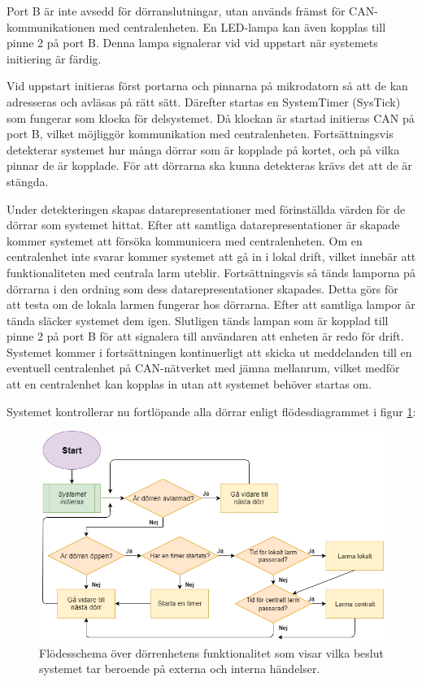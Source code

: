 \documentclass{article}
\begin{document}
Port B är inte avsedd för dörranslutningar, utan används främst för CAN-\\kommunikationen
med centralenheten. En LED-lampa kan även kopplas till \\ pinne 2 på port B. Denna lampa signalerar vid vid uppstart när systemets initiering är färdig.

Vid uppstart initieras först portarna och pinnarna på mikrodatorn så att de kan adresseras
och avläsas på rätt sätt. Därefter startas en SystemTimer (SysTick) som fungerar som klocka för delsystemet.
Då klockan är startad initieras CAN på port B, vilket möjliggör kommunikation med centralenheten. Fortsättningsvis detekterar systemet hur många dörrar som är kopplade på kortet, och på vilka pinnar de är kopplade. För att dörrarna ska kunna detekteras krävs det att de är stängda.

Under detekteringen skapas datarepresentationer med förinställda värden för de dörrar som systemet
hittat. Efter att samtliga datarepresentationer är skapade kommer systemet att försöka kommunicera med centralenheten. Om en centralenhet inte svarar kommer systemet att gå in i lokal drift, vilket innebär att funktionaliteten med centrala larm uteblir.
Fortsättningsvis så tänds lamporna på dörrarna i den ordning som dess datarepresentationer skapades. Detta görs för att testa om de lokala larmen fungerar hos dörrarna. Efter att samtliga lampor är tända släcker systemet dem igen.
Slutligen tänds lampan som är kopplad till pinne 2 på port B för att signalera till användaren att enheten är redo för drift. Systemet kommer i fortsättningen kontinuerligt att skicka ut meddelanden till en eventuell centralenhet på CAN-nätverket med jämna mellanrum, vilket medför att en centralenhet kan kopplas in utan att systemet behöver startas om.

Systemet kontrollerar nu fortlöpande alla dörrar enligt flödesdiagrammet i figur \ref{fig:dörrflöde}:



\begin{figure}[H]
\begin{flushleft}
\end{flushleft}
\centering
\includegraphics[scale=0.5]{figurer/Flow-Chart.png}
\caption{Flödesschema över dörrenhetens funktionalitet som visar vilka beslut systemet tar beroende på externa och interna händelser.}
\label{fig:dörrflöde}
\end{figure}
\end{document}
